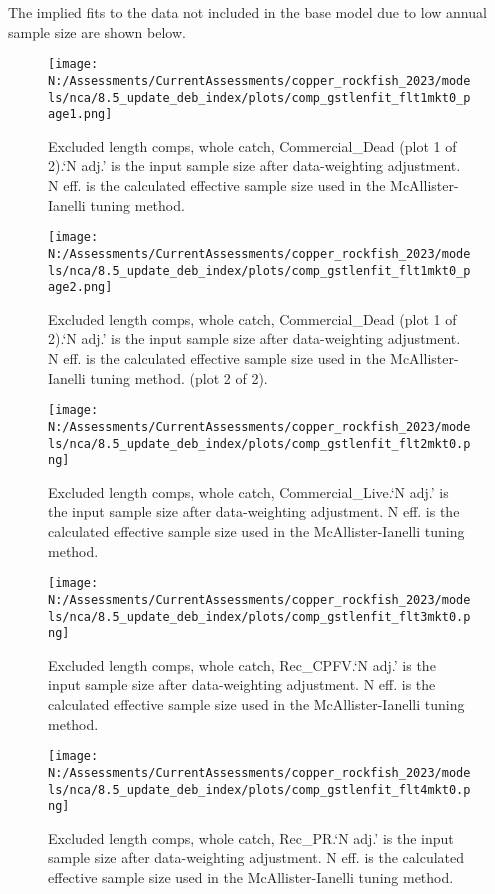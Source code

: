 \documentclass[11pt,
  english,
  letterpaper,
]{article}
\begin{document}
The implied fits to the data not included in the base model due to low annual sample size are shown below.

\begin{figure}
\centering
\texttt{[image: N:/Assessments/CurrentAssessments/copper\_rockfish\_2023/models/nca/8.5\_update\_deb\_index/plots/comp\_gstlenfit\_flt1mkt0\_page1.png]}
\caption{Excluded length comps, whole catch, Commercial\_Dead (plot 1 of 2).`N adj.' is the input sample size after data-weighting adjustment. N eff. is the calculated effective sample size used in the McAllister-Ianelli tuning method.\label{fig:comp_gstlenfit_flt1mkt0_page1}}
\end{figure}

\begin{figure}
\centering
\texttt{[image: N:/Assessments/CurrentAssessments/copper\_rockfish\_2023/models/nca/8.5\_update\_deb\_index/plots/comp\_gstlenfit\_flt1mkt0\_page2.png]}
\caption{Excluded length comps, whole catch, Commercial\_Dead (plot 1 of 2).`N adj.' is the input sample size after data-weighting adjustment. N eff. is the calculated effective sample size used in the McAllister-Ianelli tuning method. (plot 2 of 2).\label{fig:comp_gstlenfit_flt1mkt0_page2}}
\end{figure}

\begin{figure}
\centering
\texttt{[image: N:/Assessments/CurrentAssessments/copper\_rockfish\_2023/models/nca/8.5\_update\_deb\_index/plots/comp\_gstlenfit\_flt2mkt0.png]}
\caption{Excluded length comps, whole catch, Commercial\_Live.`N adj.' is the input sample size after data-weighting adjustment. N eff. is the calculated effective sample size used in the McAllister-Ianelli tuning method.\label{fig:comp_gstlenfit_flt2mkt0}}
\end{figure}

\begin{figure}
\centering
\texttt{[image: N:/Assessments/CurrentAssessments/copper\_rockfish\_2023/models/nca/8.5\_update\_deb\_index/plots/comp\_gstlenfit\_flt3mkt0.png]}
\caption{Excluded length comps, whole catch, Rec\_CPFV.`N adj.' is the input sample size after data-weighting adjustment. N eff. is the calculated effective sample size used in the McAllister-Ianelli tuning method.\label{fig:comp_gstlenfit_flt3mkt0}}
\end{figure}

\begin{figure}
\centering
\texttt{[image: N:/Assessments/CurrentAssessments/copper\_rockfish\_2023/models/nca/8.5\_update\_deb\_index/plots/comp\_gstlenfit\_flt4mkt0.png]}
\caption{Excluded length comps, whole catch, Rec\_PR.`N adj.' is the input sample size after data-weighting adjustment. N eff. is the calculated effective sample size used in the McAllister-Ianelli tuning method.\label{fig:comp_gstlenfit_flt4mkt0}}
\end{figure}
\end{document}
